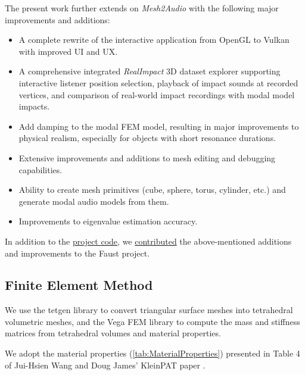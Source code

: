 \documentclass[12pt]{article}
\begin{document}
The present work further extends on \textit{Mesh2Audio} with the following major improvements and additions:
\begin{itemize}
  \item A complete rewrite of the interactive application from OpenGL to Vulkan with improved UI and UX.
  \item A comprehensive integrated \textit{RealImpact} 3D dataset explorer supporting interactive listener position selection, playback of impact sounds at recorded vertices, and comparison of real-world impact recordings with modal model impacts.
  \item Add damping to the modal FEM model, resulting in major improvements to physical realism, especially for objects with short resonance durations.
  \item Extensive improvements and additions to mesh editing and debugging capabilities.
  \item Ability to create mesh primitives (cube, sphere, torus, cylinder, etc.) and generate modal audio models from them.
  \item Improvements to eigenvalue estimation accuracy.
\end{itemize}
In addition to the \href{https://github.com/khiner/MeshEditor}{project code}, we \href{https://github.com/grame-cncm/faust/pull/1019}{contributed} the above-mentioned additions and improvements to the Faust project.

\subsection{Finite Element Method}

We use the tetgen library \cite{si_tetgen_2015} to convert triangular surface meshes into tetrahedral volumetric meshes, and the Vega FEM library \cite{vegafem} to compute the mass and stiffness matrices from tetrahedral volumes and material properties.

We adopt the material properties (\ref{tab:MaterialProperties}) presented in Table 4 of Jui-Hsien Wang and Doug James' KleinPAT paper \cite{wang_kleinpat_2019}.
\end{document}
